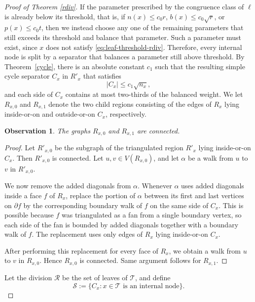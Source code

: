 \documentclass[11pt]{article}
\theoremstyle{plain}
\newtheorem{observation}[theorem]{Observation}
\theoremstyle{definition}
\theoremstyle{remark}
\begin{document}
\begin{proof}[Proof of Theorem \ref{rdiv}]
\noindent If the parameter prescribed by the congruence class of \(\ell\) is already below its threshold, that is, if \(n(x) \le c_0r\), \(b(x) \le c_0\sqrt r\), or \(p(x) \le c_0t\), then we instead choose any one of the remaining parameters that still exceeds its threshold and balance that parameter. Such a parameter must exist, since \(x\) does not satisfy \eqref{eq:leaf-threshold-rdiv}. Therefore, every internal node is split by a separator that balances a parameter still above threshold.  By Theorem~\ref{cycle}, there is an absolute constant \(c_1\) such that the resulting simple cycle separator \(C_x\) in $R'_x$ that satisfies
\[
|C_x|\le c_1\sqrt{n_x},
\]
and each side of \(C_x\) contains at most two-thirds of the balanced weight. We let \(R_{x,0}\) and \(R_{x,1}\) denote the two child regions consisting of the edges of \(R_x\) lying inside-or-on and outside-or-on \(C_x\), respectively.  



\begin{observation}
    The graphs $R_{x,0}$ and $R_{x,1}$ are connected.
\end{observation}

\begin{proof}
Let \(R'_{x,0}\) be the subgraph of the triangulated region \(R'_x\) lying inside-or-on \(C_x\). Then \(R'_{x,0}\) is connected. Let \(u,v\in V(R_{x,0})\), and let \(\alpha\) be a walk from \(u\) to \(v\) in \(R'_{x,0}\).

We now remove the added diagonals from \(\alpha\). Whenever \(\alpha\) uses added diagonals inside a face \(f\) of \(R_x\), replace the portion of \(\alpha\) between its first and last vertices on \(\partial f\) by the corresponding boundary walk of \(f\) on the same side of \(C_x\). This is possible because \(f\) was triangulated as a fan from a single boundary vertex, so each side of the fan is bounded by added diagonals together with a boundary walk of \(f\). The replacement uses only edges of \(R_x\) lying inside-or-on \(C_x\).

After performing this replacement for every face of \(R_x\), we obtain a walk from \(u\) to \(v\) in \(R_{x,0}\). Hence \(R_{x,0}\) is connected.  Same argument follows for $R_{x,1}$.
\end{proof}






Let the division \(\mathcal R\) be the set of leaves of \(\mathcal T\), and define
\[
\mathcal S:=\{C_x:x\in\mathcal T \text{ is an internal node}\}.
\]


\end{proof}
\end{document}
